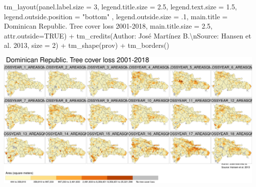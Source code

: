 \documentclass[10pt,landscape,a3paper]{article}
\newenvironment{Shaded}{\begin{snugshade}}{\end{snugshade}}
\newcommand{\AttributeTok}[1]{\textcolor[rgb]{0.77,0.63,0.00}{#1}}
\newcommand{\ConstantTok}[1]{\textcolor[rgb]{0.00,0.00,0.00}{#1}}
\newcommand{\DecValTok}[1]{\textcolor[rgb]{0.00,0.00,0.81}{#1}}
\newcommand{\FloatTok}[1]{\textcolor[rgb]{0.00,0.00,0.81}{#1}}
\newcommand{\FunctionTok}[1]{\textcolor[rgb]{0.00,0.00,0.00}{#1}}
\newcommand{\NormalTok}[1]{#1}
\newcommand{\SpecialCharTok}[1]{\textcolor[rgb]{0.00,0.00,0.00}{#1}}
\newcommand{\StringTok}[1]{\textcolor[rgb]{0.31,0.60,0.02}{#1}}
\begin{document}
\begin{Shaded}
\begin{Highlighting}[]
  \FunctionTok{tm\_layout}\NormalTok{(}\AttributeTok{panel.label.size =} \DecValTok{3}\NormalTok{, }\AttributeTok{legend.title.size =} \FloatTok{2.5}\NormalTok{, }\AttributeTok{legend.text.size =} \FloatTok{1.5}\NormalTok{,}
            \AttributeTok{legend.outside.position =} \StringTok{"bottom"}\NormalTok{ , }\AttributeTok{legend.outside.size =}\NormalTok{ .}\DecValTok{1}\NormalTok{,}
            \AttributeTok{main.title =} \StringTok{\textquotesingle{}Dominican Republic. Tree cover loss 2001{-}2018\textquotesingle{}}\NormalTok{,}
            \AttributeTok{main.title.size =} \FloatTok{2.5}\NormalTok{, }\AttributeTok{attr.outside=}\ConstantTok{TRUE}\NormalTok{) }\SpecialCharTok{+} 
  \FunctionTok{tm\_credits}\NormalTok{(}\StringTok{\textquotesingle{}Author: José Martínez B.}\SpecialCharTok{\textbackslash{}n}\StringTok{Source: Hansen et al. 2013\textquotesingle{}}\NormalTok{, }\AttributeTok{size =} \DecValTok{2}\NormalTok{) }\SpecialCharTok{+}
  \FunctionTok{tm\_shape}\NormalTok{(prov) }\SpecialCharTok{+} \FunctionTok{tm\_borders}\NormalTok{()}
\end{Highlighting}
\end{Shaded}

\begin{center}\includegraphics{img/data-download-preparation-eda/zonal-long-term-grid-5} \end{center}
\end{document}
